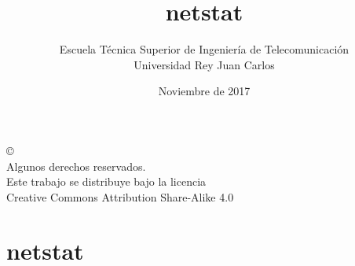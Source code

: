 \documentclass[ucs]{beamer}
\begin{document}
\title[netstat]{netstat }
\author[GSyC]{Escuela Técnica Superior de Ingeniería de Telecomunicación\\
Universidad Rey Juan Carlos}
\date[2017]{Noviembre de 2017}






\begin{frame}
  \titlepage
\end{frame}



\begin{frame}[b]
\begin{flushright}
{\tiny
\copyright \insertshortdate~\insertshortauthor \\
  Algunos derechos reservados. \\
  Este trabajo se distribuye bajo la licencia \\
  Creative Commons Attribution Share-Alike 4.0\\
}
\end{flushright}  
\end{frame}






\section{netstat}
\end{document}
